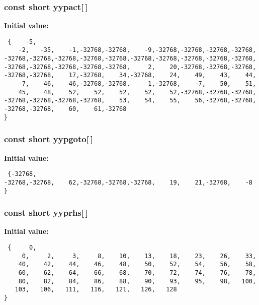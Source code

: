 \subsubsection{\setlength{\rightskip}{0pt plus 5cm}const short yypact[$\,$]\hspace{0.3cm}{\tt  [static]}}\label{vcd__parser_8c_a92}


{\bf Initial value:}

\footnotesize\begin{verbatim} {    -5,
    -2,   -35,    -1,-32768,-32768,    -9,-32768,-32768,-32768,-32768,
-32768,-32768,-32768,-32768,-32768,-32768,-32768,-32768,-32768,-32768,
-32768,-32768,-32768,-32768,-32768,     2,    20,-32768,-32768,-32768,
-32768,-32768,    17,-32768,    34,-32768,    24,    49,    43,    44,
    -7,    46,    46,-32768,-32768,     1,-32768,    -7,    50,    51,
    45,    48,    52,    52,    52,    52,    52,-32768,-32768,-32768,
-32768,-32768,-32768,-32768,    53,    54,    55,    56,-32768,-32768,
-32768,-32768,    60,    61,-32768
}\end{verbatim}\normalsize 
{}
\subsubsection{\setlength{\rightskip}{0pt plus 5cm}const short yypgoto[$\,$]\hspace{0.3cm}{\tt  [static]}}\label{vcd__parser_8c_a93}


{\bf Initial value:}

\footnotesize\begin{verbatim} {-32768,
-32768,-32768,    62,-32768,-32768,-32768,    19,    21,-32768,    -8
}\end{verbatim}\normalsize 
{}
\subsubsection{\setlength{\rightskip}{0pt plus 5cm}const short yyprhs[$\,$]\hspace{0.3cm}{\tt  [static]}}\label{vcd__parser_8c_a84}


{\bf Initial value:}

\footnotesize\begin{verbatim} {     0,
     0,     2,     3,     8,    10,    13,    18,    23,    26,    33,
    40,    42,    44,    46,    48,    50,    52,    54,    56,    58,
    60,    62,    64,    66,    68,    70,    72,    74,    76,    78,
    80,    82,    84,    86,    88,    90,    93,    95,    98,   100,
   103,   106,   111,   116,   121,   126,   128
}\end{verbatim}\normalsize 
{}
